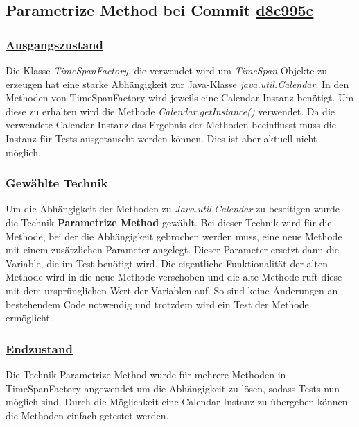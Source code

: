 \newpage

\subsection{Parametrize Method bei Commit \href{https://github.com/lukaspanni/OpenSourceStats/commit/d8c995c387a792a6d83c852119760b0c57a63c02} {d8c995c}}

\subsubsection*{\href{https://github.com/lukaspanni/OpenSourceStats/tree/eafe840d0bfc8a08beca01709003d5afe7e59963/app/src/main/java/de/lukaspanni/opensourcestats/util/TimeSpanFactory.java}{Ausgangszustand}}
Die Klasse \textit{TimeSpanFactory}, die verwendet wird um \textit{TimeSpan}-Objekte zu erzeugen hat eine starke Abhängigkeit zur Java-Klasse \textit{java.util.Calendar}.
In den Methoden von TimeSpanFactory wird jeweils eine Calendar-Instanz benötigt. 
Um diese zu erhalten wird die Methode \textit{Calendar.getInstance()} verwendet.
Da die verwendete Calendar-Instanz das Ergebnis der Methoden beeinflusst muss die Instanz für Tests ausgetauscht werden können.
Dies ist aber aktuell nicht möglich.

\subsubsection*{Gewählte Technik}
Um die Abhängigkeit der Methoden zu \textit{Java.util.Calendar} zu beseitigen wurde die Technik \textbf{Parametrize Method} gewählt.
Bei dieser Technik wird für die Methode, bei der die Abhängigkeit gebrochen werden muss, eine neue Methode mit einem zusätzlichen Parameter angelegt.
Dieser Parameter ersetzt dann die Variable, die im Test benötigt wird.
Die eigentliche Funktionalität der alten Methode wird in die neue Methode verschoben und die alte Methode ruft diese mit dem ursprünglichen Wert der Variablen auf.
So sind keine Änderungen an bestehendem Code notwendig und trotzdem wird ein Test der Methode ermöglicht.

\subsubsection*{\href{https://github.com/lukaspanni/OpenSourceStats/tree/d8c995c387a792a6d83c852119760b0c57a63c02/app/src/main/java/de/lukaspanni/opensourcestats/util/TimeSpanFactory.java}{Endzustand}}

Die Technik Parametrize Method wurde für mehrere Methoden in TimeSpanFactory angewendet um die Abhängigkeit zu lösen, sodass Tests nun möglich sind.
Durch die Möglichkeit eine Calendar-Instanz zu übergeben können die Methoden einfach getestet werden.

